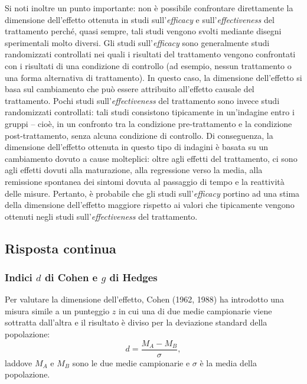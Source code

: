 Si noti inoltre un punto importante: non è possibile confrontare direttamente la dimensione dell'effetto ottenuta in studi sull'\emph{efficacy} e sull'\emph{effectiveness} del trattamento perché, quasi sempre, tali studi vengono svolti mediante disegni sperimentali molto diversi.
Gli studi sull'\emph{efficacy} sono generalmente studi randomizzati controllati nei quali i risultati del trattamento vengono confrontati con i risultati di una condizione di controllo (ad esempio, nessun trattamento o una forma alternativa di trattamento). 
In questo caso, la dimensione dell'effetto si basa sul cambiamento che può essere attribuito all'effetto causale del trattamento. 
Pochi studi sull'\emph{effectiveness} del trattamento sono invece studi randomizzati controllati: tali studi consistono tipicamente in un'indagine entro i gruppi -- cioè, in un confronto tra la condizione pre-trattamento e la condizione post-trattamento, senza alcuna condizione di controllo. 
Di conseguenza, la dimensione dell'effetto ottenuta in questo tipo di indagini è basata su un cambiamento dovuto a cause molteplici: oltre agli effetti del trattamento, ci sono agli effetti dovuti alla maturazione, alla regressione verso la media, alla remissione spontanea dei sintomi dovuta al passaggio di tempo e la reattività delle misure. 
Pertanto, è probabile che gli studi sull'\emph{efficacy} portino ad una stima della dimensione dell'effetto maggiore rispetto ai valori che tipicamente vengono ottenuti negli studi sull'\emph{effectiveness} del trattamento.


\subsection{Risposta continua}
\label{sec:cont_reponse_eff_size}

\subsubsection{Indici $d$ di Cohen e $g$ di Hedges}

Per valutare la dimensione dell'effetto, Cohen (1962, 1988) ha introdotto una misura simile a un punteggio $z$ in cui una di due medie campionarie viene sottratta dall'altra e il risultato è diviso per la deviazione standard della popolazione:
\begin{equation}
d = \frac{M_A - M_B}{\sigma},
\label{eq:d_cohen}
\end{equation}
laddove $M_A$ e $M_B$ sono le due medie campionarie e $\sigma$ è la media della popolazione.

